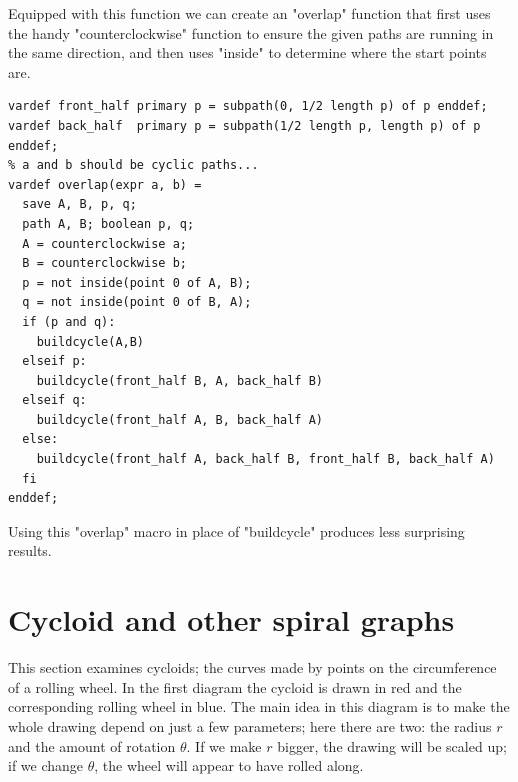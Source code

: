 \documentclass[a4paper,landscape]{article}
\def\mpic#1#2{\vadjust{\moveright5.5in\vbox to 0pt{\vskip#1\texttt{[image: \#2]}\vss}}}
\begin{document}
Equipped with this function we can create an "overlap" function that first uses the
handy "counterclockwise" function to ensure the given paths are running in the
same direction, and then uses "inside" to determine where the start points are.
\begin{verbatim}
vardef front_half primary p = subpath(0, 1/2 length p) of p enddef;
vardef back_half  primary p = subpath(1/2 length p, length p) of p enddef;
% a and b should be cyclic paths...
vardef overlap(expr a, b) = 
  save A, B, p, q;
  path A, B; boolean p, q;
  A = counterclockwise a;
  B = counterclockwise b;
  p = not inside(point 0 of A, B);
  q = not inside(point 0 of B, A);
  if (p and q): 
    buildcycle(A,B)
  elseif p: 
    buildcycle(front_half B, A, back_half B)
  elseif q: 
    buildcycle(front_half A, B, back_half A)
  else: 
    buildcycle(front_half A, back_half B, front_half B, back_half A)
  fi
enddef;
\end{verbatim}
Using this "overlap" macro in place of "buildcycle" produces less surprising
results.\mpic{-2in}{overlaps4}

\newpage \section{Cycloid and other spiral graphs}

This section examines cycloids; the curves made by points on the circumference of a
rolling wheel.  In the first diagram the cycloid is drawn in red and the
corresponding rolling wheel in blue.  The main idea in this diagram is to make the
whole drawing depend on just a few parameters;  here there are two: the radius $r$
and the amount of rotation $θ$.  If we make $r$ bigger, the drawing will be
scaled up; if we change $θ$, the wheel will appear to have rolled along.
\mpic{-66pt}{cycloids1}
\end{document}
